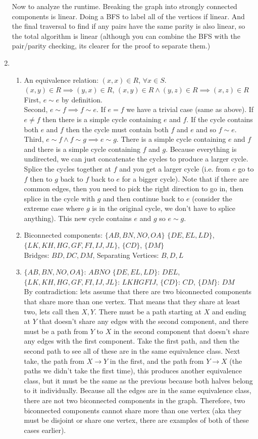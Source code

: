 \documentclass[11pt]{article}
\begin{document}
\begin{enumerate}
Now to analyze the runtime. Breaking the graph into strongly connected components is linear. Doing a BFS to label all of the vertices if linear. And the final traversal to find if any pairs have the same parity is also linear, so the total algorithm is linear (although you can combine the BFS with the pair/parity checking, its clearer for the proof to separate them.)
\newpage
\item
\begin{enumerate}
\item An equivalence relation: $(x,x)\in R$, $ \forall x\in S$. $(x,y)\in R \implies (y,x)\in R$, $(x,y)\in R \wedge (y,z)\in R\implies (x,z)\in R$\\
First, $e\sim e$ by definition.\\
Second, $e\sim f \implies f \sim e$. If $e = f$ we have a trivial case (same as above). If $e\neq f$ then there is a simple cycle containing $e$ and $f$. If the cycle contains both $e$ and $f$ then the cycle must contain both $f$ and $e$ and so $f\sim e$.\\
Third, $e\sim f \wedge f\sim g \implies e\sim g$. There is a simple cycle containing $e$ and $f$ and there is a simple cycle containing $f$ and $g$. Because everything is undirected, we can just concatenate the cycles to produce a larger cycle. Splice the cycles together at $f$ and you get a larger cycle (i.e. from $e$ go to $f$ then to $g$ back to $f$ back to $e$ for a bigger cycle). Note that if there are common edges, then you need to pick the right direction to go in, then splice in the cycle with $g$ and then continue back to $e$ (consider the extreme case where $g$ is in the original cycle, we don't have to splice anything). This new cycle contains $e$ and $g$ so $e\sim g$.
\item Biconnected components: $\{AB,BN,NO,OA\}$ $\{DE,EL,LD\}$, \\
$\{LK,KH,HG,GF,FI,IJ,JL\}$, $\{CD\}$, $\{DM\}$\\
Bridges: $BD,DC,DM$, Separating Vertices: $B,D,L$
\item $\{AB,BN,NO,OA\}$: $ABNO$ $\{DE,EL,LD\}$: $DEL$, \\
$\{LK,KH,HG,GF,FI,IJ,JL\}$: $LKHGFIJ$, $\{CD\}$: $CD$, $\{DM\}$: $DM$\\
By contradiction: lets assume that there are two biconnected components that share more than one vertex. That means that they share at least two, lets call then $X,Y$. There must be a path starting at $X$ and ending at $Y$ that doesn't share any edges with the second component, and there must be a path from $Y$ to $X$ in the second component that doesn't share any edges with the first component. Take the first path, and then the second path to see all of these are in the same equivalence class. Next take, the path from $X\to Y$ in the first, and the path from $Y\to X$ (the paths we didn't take the first time), this produces another equivalence class, but it must be the same as the previous because both halves belong to it individually. Because all the edges are in the same equivalence class, there are not two biconnected components in the graph. Therefore, two biconnected components cannot share more than one vertex (aka they must be disjoint or share one vertex, there are examples of both of these cases earlier).

\end{enumerate}
\end{enumerate}
\end{document}
